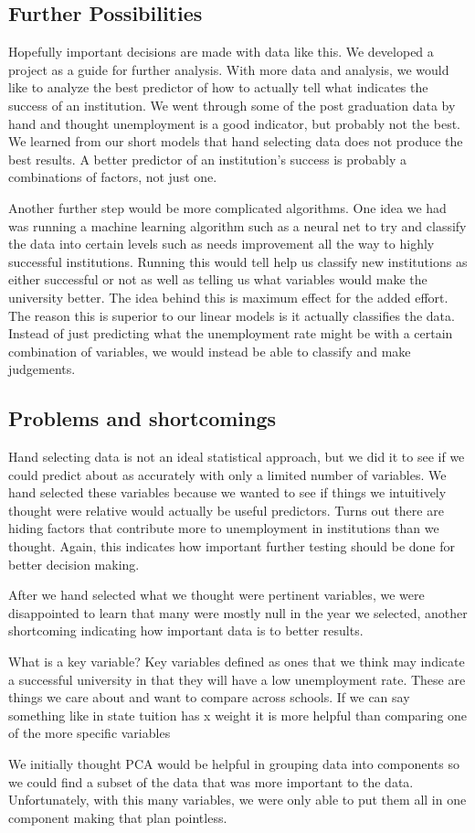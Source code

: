 \documentclass{article}\usepackage[]{graphicx}\usepackage[]{color}
\begin{document}
\subsection{Further Possibilities}
Hopefully important decisions are made with data like this. We developed a project as a guide for further analysis. With more data and analysis, we would like to analyze the best predictor of how to actually tell what indicates the success of an institution. We went through some of the post graduation data by hand and thought unemployment is a good indicator, but probably not the best. We learned from our short models that hand selecting data does not produce the best results. A better predictor of an institution's success is probably a combinations of factors, not just one.

Another further step would be more complicated algorithms. One idea we had was running a machine learning algorithm such as a neural net to try and classify the data into certain levels such as needs improvement all the way to highly successful institutions. Running this would tell help us classify new institutions as either successful or not as well as telling us what variables would make the university better. The idea behind this is maximum effect for the added effort. The reason this is superior to our linear models is it actually classifies the data. Instead of just predicting what the unemployment rate might be with a certain combination of variables, we would instead be able to classify and make judgements. 

\subsection{Problems and shortcomings}
Hand selecting data is not an ideal statistical approach, but we did it to see if we could predict about as accurately with only a limited number of variables. We hand selected these variables because we wanted to see if things we intuitively thought were relative would actually be useful predictors. Turns out there are hiding factors that contribute more to unemployment in institutions than we thought. Again, this indicates how important further testing should be done for better decision making. 

After we hand selected what we thought were pertinent variables, we were disappointed to learn that many were mostly null in the year we selected, another shortcoming indicating how important data is to better results. 

What is a key variable? Key variables defined as ones that we think may indicate a successful university in that they will have a low unemployment rate. These are things we care about and want to compare across schools. If we can say something like in state tuition has x weight it is more helpful than comparing one of the more specific variables

We initially thought PCA would be helpful in grouping data into components so we could find a subset of the data that was more important to the data. Unfortunately, with this many variables, we were only able to put them all in one component making that plan pointless. 
\end{document}
